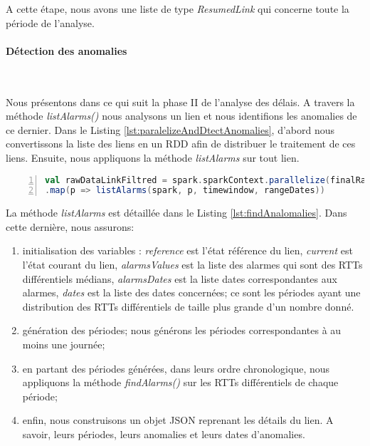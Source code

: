 A cette étape, nous avons une liste de type \textit{ResumedLink} qui concerne toute la période de l'analyse. 



\paragraph{Détection des anomalies}~

Nous présentons dans ce qui suit la phase II de l'analyse des délais. A travers la méthode \textit{listAlarms()} nous analysons un lien et nous identifions les anomalies de ce dernier. Dans le Listing \ref{lst:paralelizeAndDtectAnomalies}, d'abord nous convertissons la liste des liens en un RDD afin de distribuer le traitement de ces liens. Ensuite, nous appliquons la méthode \textit{listAlarms} sur tout lien. 

\begin{lstlisting}[language=scala,firstnumber=1, caption={Détection des alarmes des liens},label={lst:paralelizeAndDtectAnomalies}, basicstyle = \footnotesize,escapechar=|,numbers=left,
stepnumber=1]
val rawDataLinkFiltred = spark.sparkContext.parallelize(finalRawRttDiff.toSeq)
.map(p => listAlarms(spark, p, timewindow, rangeDates))
\end{lstlisting}

La méthode \textit{listAlarms} est détaillée dans le Listing \ref{lst:findAnalomalies}. Dans cette dernière, nous assurons:


\begin{enumerate}
	\item initialisation des variables : \textit{reference} est l'état référence du lien, \textit{current} est l'état courant du lien, \textit{alarmsValues} est la liste des alarmes qui sont des RTTs différentiels médians, \textit{alarmsDates} est la liste dates correspondantes aux alarmes, \textit{dates} est la liste des dates concernées; ce sont les périodes ayant une distribution des RTTs différentiels de taille plus grande d'un nombre donné.
	\item  génération des périodes; nous générons les périodes correspondantes à au moins une journée;
    \item  en partant des périodes générées, dans leurs ordre chronologique, nous appliquons la méthode \textit{findAlarms()} sur les RTTs différentiels de chaque période;
    \item enfin, nous construisons un objet JSON reprenant les détails du lien. A savoir, leurs périodes, leurs anomalies et leurs dates d'anomalies. 
\end{enumerate}

